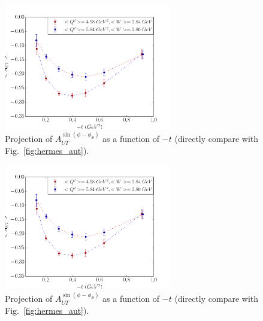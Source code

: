 \begin{figure}[!ht]
 \begin{center}
               \includegraphics[type=pdf,
        ext=.pdf,read=.pdf,width=0.65\textwidth]{./figures/bin_asym_t_fermi_02Hz}
      
      \caption{\footnotesize{Projection of $A_{UT}^{\sin(\phi-\phi_{S})}$ as a
          function of $-t$ (directly compare with Fig.~\ref{fig:hermes_aut}).}}
  \label{asym1_t}
  \end{center}
\end{figure}
\begin{figure}[!ht]
 \begin{center}
        \includegraphics[type=pdf,ext=.pdf,read=.pdf,width=0.65\textwidth]
{./figures/bin_asym_t_fermi_02Hz} 
        
        \caption{\footnotesize{Projection of $A_{UT}^{\sin(\phi-\phi_{S})}$ as a
            function of $-t$ (directly compare with
            Fig.~\ref{fig:hermes_aut}).}}
  \label{asym2_t}
  \end{center}
\end{figure}

